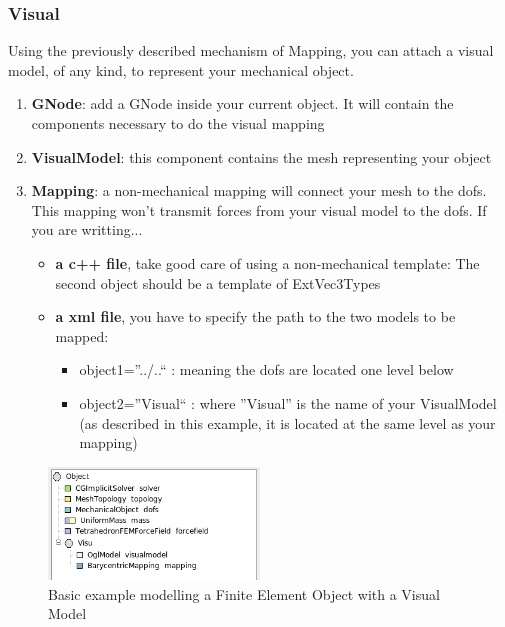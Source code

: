 \subsubsection{Visual}
Using the previously described mechanism of Mapping, you can attach a visual model, of any kind, to represent your mechanical object.

\begin{enumerate}
 \item { \bf GNode}: add a GNode inside your current object. It will contain the components necessary to do the visual mapping
 \item { \bf VisualModel}: this component contains the mesh representing your object
 \item { \bf Mapping}: a non-mechanical mapping will connect your mesh to the dofs. This mapping won't transmit forces from your visual model to the dofs. If you are writting...
\begin{itemize}
 \item { \bf a c++ file}, take good care of using a non-mechanical template: The second object should be a template of ExtVec3Types
 \item { \bf a xml file}, you have to specify the path to the two models to be mapped: 
\begin{itemize}
 \item object1=''../..`` : meaning the dofs are located one level below
 \item object2=''Visual`` : where ''Visual'' is the name of your VisualModel (as described in this example, it is located at the same level as your mapping)
\end{itemize}
\end{itemize}
 
\end{enumerate}

\begin{figure}[htpb]
	\centering
		\includegraphics[width=0.5\textwidth]{Modelling1.jpg}
	\caption{Basic example modelling a Finite Element Object with a Visual Model}
\end{figure}
